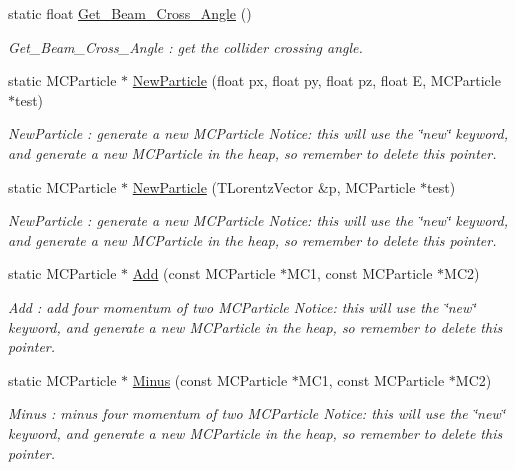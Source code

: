 \begin{DoxyCompactItemize}
static float \hyperlink{classToolSet_1_1CMC_aab8dca236c78fffe1b63bac50583090a}{Get\_\-Beam\_\-Cross\_\-Angle} ()
\begin{DoxyCompactList}\small\item\em Get\_\-Beam\_\-Cross\_\-Angle : get the collider crossing angle. \item\end{DoxyCompactList}\item 
static MCParticle $\ast$ \hyperlink{classToolSet_1_1CMC_ab30c29f999f2b3dd1c85ed68636f2281}{NewParticle} (float px, float py, float pz, float E, MCParticle $\ast$test)
\begin{DoxyCompactList}\small\item\em NewParticle : generate a new MCParticle Notice: this will use the \char`\"{}new\char`\"{} keyword, and generate a new MCParticle in the heap, so remember to delete this pointer. \item\end{DoxyCompactList}\item 
static MCParticle $\ast$ \hyperlink{classToolSet_1_1CMC_a5bd1a7515135570ef348bd77d1d26933}{NewParticle} (TLorentzVector \&p, MCParticle $\ast$test)
\begin{DoxyCompactList}\small\item\em NewParticle : generate a new MCParticle Notice: this will use the \char`\"{}new\char`\"{} keyword, and generate a new MCParticle in the heap, so remember to delete this pointer. \item\end{DoxyCompactList}\item 
static MCParticle $\ast$ \hyperlink{classToolSet_1_1CMC_ad1b2172aaacc40d4f5971492a5d1a0f5}{Add} (const MCParticle $\ast$MC1, const MCParticle $\ast$MC2)
\begin{DoxyCompactList}\small\item\em Add : add four momentum of two MCParticle Notice: this will use the \char`\"{}new\char`\"{} keyword, and generate a new MCParticle in the heap, so remember to delete this pointer. \item\end{DoxyCompactList}\item 
static MCParticle $\ast$ \hyperlink{classToolSet_1_1CMC_aa597db31bacbc37cbc16da5bfe2b1d9a}{Minus} (const MCParticle $\ast$MC1, const MCParticle $\ast$MC2)
\begin{DoxyCompactList}\small\item\em Minus : minus four momentum of two MCParticle Notice: this will use the \char`\"{}new\char`\"{} keyword, and generate a new MCParticle in the heap, so remember to delete this pointer. \item\end{DoxyCompactList}\item 

\end{DoxyCompactItemize}
